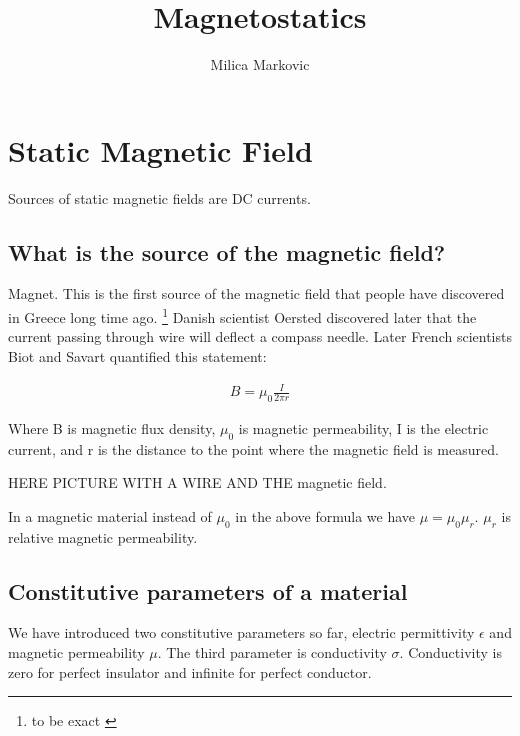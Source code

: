 





 
\title{Magnetostatics} 
\author{Milica Markovic} 
  
\begin{abstract}  

\end{abstract}  
\maketitle    


\section{Static Magnetic Field}

Sources of static magnetic fields are DC currents.

\subsection{What is the source of the magnetic field?}

Magnet. This is the first source of the magnetic field that people have discovered in Greece long time ago. \footnote{to be exact } Danish scientist Oersted discovered later that the current passing through wire will deflect a compass needle. Later French scientists Biot and Savart quantified this statement:

\begin{eqnarray}
B = \mu_0 \frac{I}{2 \pi r}
\end{eqnarray}

Where B is magnetic flux density, $\mu_0$ is magnetic permeability, I is the electric current, and r is the distance to the point where the magnetic field is measured.

HERE PICTURE WITH A WIRE AND THE magnetic field.



In a magnetic material instead of $\mu_0$ in the above formula we have $\mu=\mu_0 \mu_r$. $\mu_r$ is relative magnetic permeability.

\subsection{Constitutive parameters of a material}

We have introduced two constitutive parameters so far, electric permittivity $\epsilon$ and magnetic permeability $\mu$. The third parameter is conductivity $\sigma$. Conductivity is zero for perfect insulator and infinite for perfect conductor. 

